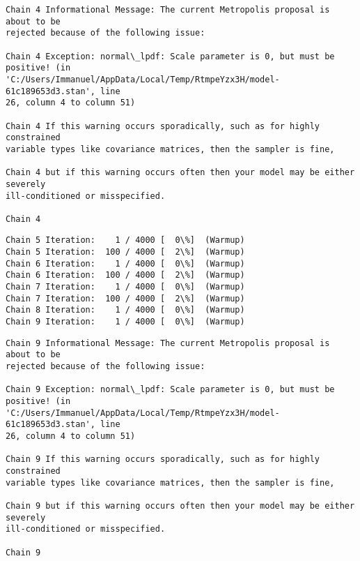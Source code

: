 \documentclass[11pt]{article}
\begin{document}
    \begin{Verbatim}[commandchars=\\\{\}]
Chain 4 Informational Message: The current Metropolis proposal is about to be
rejected because of the following issue:

Chain 4 Exception: normal\_lpdf: Scale parameter is 0, but must be positive! (in
'C:/Users/Immanuel/AppData/Local/Temp/RtmpeYzx3H/model-61c189653d3.stan', line
26, column 4 to column 51)

Chain 4 If this warning occurs sporadically, such as for highly constrained
variable types like covariance matrices, then the sampler is fine,

Chain 4 but if this warning occurs often then your model may be either severely
ill-conditioned or misspecified.

Chain 4

    \end{Verbatim}

    \begin{Verbatim}[commandchars=\\\{\}]
Chain 5 Iteration:    1 / 4000 [  0\%]  (Warmup)
Chain 5 Iteration:  100 / 4000 [  2\%]  (Warmup)
Chain 6 Iteration:    1 / 4000 [  0\%]  (Warmup)
Chain 6 Iteration:  100 / 4000 [  2\%]  (Warmup)
Chain 7 Iteration:    1 / 4000 [  0\%]  (Warmup)
Chain 7 Iteration:  100 / 4000 [  2\%]  (Warmup)
Chain 8 Iteration:    1 / 4000 [  0\%]  (Warmup)
Chain 9 Iteration:    1 / 4000 [  0\%]  (Warmup)
    \end{Verbatim}

    \begin{Verbatim}[commandchars=\\\{\}]
Chain 9 Informational Message: The current Metropolis proposal is about to be
rejected because of the following issue:

Chain 9 Exception: normal\_lpdf: Scale parameter is 0, but must be positive! (in
'C:/Users/Immanuel/AppData/Local/Temp/RtmpeYzx3H/model-61c189653d3.stan', line
26, column 4 to column 51)

Chain 9 If this warning occurs sporadically, such as for highly constrained
variable types like covariance matrices, then the sampler is fine,

Chain 9 but if this warning occurs often then your model may be either severely
ill-conditioned or misspecified.

Chain 9

    \end{Verbatim}
\end{document}
